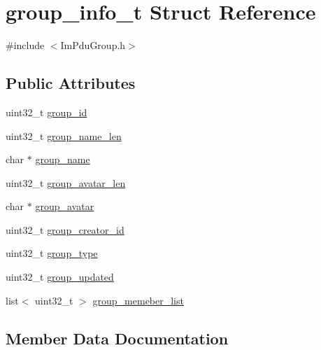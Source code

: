 \hypertarget{structgroup__info__t}{}\section{group\+\_\+info\+\_\+t Struct Reference}
\label{structgroup__info__t}


{\ttfamily \#include $<$Im\+Pdu\+Group.\+h$>$}

\subsection*{Public Attributes}
\begin{DoxyCompactItemize}
\item 
uint32\+\_\+t \hyperlink{structgroup__info__t_ad11331e7d0ec2aedd5c9ff3f5ae0ad29}{group\+\_\+id}
\item 
uint32\+\_\+t \hyperlink{structgroup__info__t_a6e553888edf7da80eb61253721d64556}{group\+\_\+name\+\_\+len}
\item 
char $\ast$ \hyperlink{structgroup__info__t_ae4121e42787880b40f8dec0b1b4ebe63}{group\+\_\+name}
\item 
uint32\+\_\+t \hyperlink{structgroup__info__t_a3fc1c0b4eabc111616780b4cf76f83b0}{group\+\_\+avatar\+\_\+len}
\item 
char $\ast$ \hyperlink{structgroup__info__t_ad497676f7774e0ddd1f627d1833ecf0e}{group\+\_\+avatar}
\item 
uint32\+\_\+t \hyperlink{structgroup__info__t_a3f924453b699cbef18295d14b80555fb}{group\+\_\+creator\+\_\+id}
\item 
uint32\+\_\+t \hyperlink{structgroup__info__t_af56bf20cb2c1507d4446eca59dee32f2}{group\+\_\+type}
\item 
uint32\+\_\+t \hyperlink{structgroup__info__t_a2338bea66c1063bc1b61e4348b03af78}{group\+\_\+updated}
\item 
list$<$ uint32\+\_\+t $>$ \hyperlink{structgroup__info__t_a69f761d2aa619de8490ff41d8f7af946}{group\+\_\+memeber\+\_\+list}
\end{DoxyCompactItemize}


\subsection{Member Data Documentation}
\hypertarget{structgroup__info__t_ad497676f7774e0ddd1f627d1833ecf0e}{}
